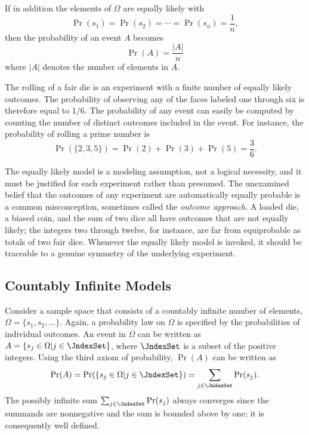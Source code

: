 If in addition the elements of $\Omega$ are equally likely with
\begin{equation*}
\Pr (s_1) = \Pr (s_2) = \cdots = \Pr (s_n) = \frac{1}{n} ,
\end{equation*}
then the probability of an event $A$ becomes
\begin{equation} \label{equation:ProbEquiProbableOutcomes}
\Pr (A) = \frac{ |A| }{n}
\end{equation}
where $|A|$ denotes the number of elements in $A$.

\begin{example}
The rolling of a fair die is an experiment with a finite number of equally likely outcomes.
The probability of observing any of the faces labeled one through six is therefore equal to $1/6$.
The probability of any event can easily be computed by counting the number of distinct outcomes included in the event.
For instance, the probability of rolling a prime number is
\begin{equation*}
\Pr ( \{ 2, 3, 5 \} )
= \Pr (2) + \Pr(3) + \Pr(5) = \frac{3}{6} .
\end{equation*}
\end{example}


The equally likely model is a modeling assumption, not a logical necessity, and it must be justified for each experiment rather than presumed.
The unexamined belief that the outcomes of any experiment are automatically equally probable is a common misconception, sometimes called the \emph{outcome approach}.
A loaded die, a biased coin, and the sum of two dice all have outcomes that are not equally likely;
the integers two through twelve, for instance, are far from equiprobable as totals of two fair dice.
Whenever the equally likely model is invoked, it should be traceable to a genuine symmetry of the underlying experiment.


\subsection{Countably Infinite Models}

Consider a sample space that consists of a countably infinite number of elements, $\Omega = \{ s_1, s_2, \ldots \}$.
Again, a probability law on $\Omega$ is specified by the probabilities of individual outcomes.
An event in $\Omega$ can be written as $A = \{ s_j \in \Omega | j \in \JndexSet \}$, where $\JndexSet$ is a subset of the positive integers.
Using the third axiom of probability, $\Pr (A)$ can be written as
\begin{equation*}
\Pr (A)
= \Pr ( \{ s_j \in \Omega | j \in \JndexSet \} )
= \sum_{j \in \JndexSet} \Pr (s_j) .
\end{equation*}
The possibly infinite sum $\sum_{j \in \JndexSet} \Pr (s_j)$ always converges since the summands are nonnegative and the sum is bounded above by one; it is consequently well defined.

